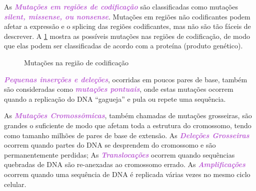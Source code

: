 \documentclass[11pt,a4paper]{article}
\begin{document}
	As \textcolor{MediumOrchid}{\textbf{\textit{Mutações em regiões de codificação}}} são classificadas como mutações \textcolor{MediumOrchid}{\textbf{\textit{silent, missense, ou nonsense}}}. Mutações em regiões não codificantes podem afetar a expressão e o splicing das regiões codificantes, mas não são tão fáceis de descrever. A \ref{fig:mutacoesPontuais2} mostra as possíveis mutações nas regiões de codificação, de modo que elas podem ser classificadas de acordo com a proteína (produto genético). 

		\begin{figure}[h]
			\centering
			\caption{Mutações na região de codificação}
			\label{fig:mutacoesPontuais2}
		\end{figure}

	\textcolor{MediumOrchid}{\textbf{\textit{Pequenas inserções e deleções}}}, ocorridas em poucos pares de base, também são consideradas como \textcolor{MediumOrchid}{\textbf{\textit{mutações pontuais}}}, onde estas mutações ocorrem quando a replicação do DNA “gagueja” e pula ou repete uma sequência. 

	As \textcolor{MediumOrchid}{\textbf{\textit{Mutações Cromossômicas}}}, também chamadas de mutações grosseiras, são grandes o suficiente de modo que afetam toda a estrutura do cromossomo, tendo como tamanho milhões de pares de base de extensão.  As \textcolor{MediumOrchid}{\textbf{\textit{Deleções Grosseiras}}} ocorrem quando partes do DNA se desprendem do cromossomo e são permanentemente perdidas;  As \textcolor{MediumOrchid}{\textbf{\textit{Translocações}}} ocorrem quando sequências quebradas de DNA são re-anexadas ao cromossomo errado. As \textcolor{MediumOrchid}{\textbf{\textit{Amplificações}}} ocorrem quando uma sequência de DNA é replicada várias vezes no mesmo ciclo celular.
\end{document}
